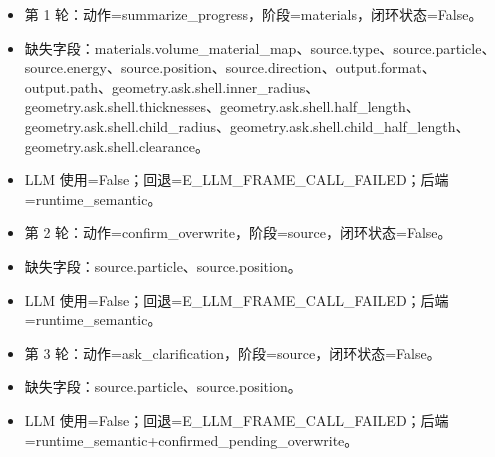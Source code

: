 \documentclass[11pt]{ctexart}
\begin{document}
\begin{itemize}
\item 第 1 轮：动作=summarize\_progress，阶段=materials，闭环状态=False。
\item 缺失字段：materials.volume\_material\_map、source.type、source.particle、source.energy、source.position、source.direction、output.format、output.path、geometry.ask.shell.inner\_radius、geometry.ask.shell.thicknesses、geometry.ask.shell.half\_length、geometry.ask.shell.child\_radius、geometry.ask.shell.child\_half\_length、geometry.ask.shell.clearance。
\item LLM 使用=False；回退=E\_LLM\_FRAME\_CALL\_FAILED；后端=runtime\_semantic。
\item 第 2 轮：动作=confirm\_overwrite，阶段=source，闭环状态=False。
\item 缺失字段：source.particle、source.position。
\item LLM 使用=False；回退=E\_LLM\_FRAME\_CALL\_FAILED；后端=runtime\_semantic。
\item 第 3 轮：动作=ask\_clarification，阶段=source，闭环状态=False。
\item 缺失字段：source.particle、source.position。
\item LLM 使用=False；回退=E\_LLM\_FRAME\_CALL\_FAILED；后端=runtime\_semantic+confirmed\_pending\_overwrite。
\end{itemize}
\end{document}
